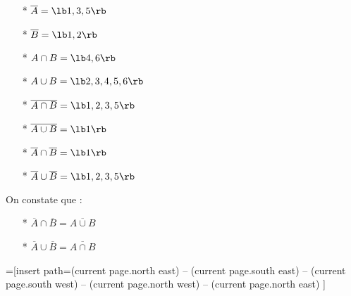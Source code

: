 \begin{itemize}
\item[*] $ \overline{A} = \lb 1,3,5\rb $ \\
\item[*] $ \overline{B} = \lb 1,2 \rb $ \\
\item[*] $ A \cap B = \lb 4, 6 \rb $ \\
\item[*] $ A \cup B = \lb 2,3,4,5,6 \rb $ \\
\item[*] $ \overline{A \cap B} = \lb 1, 2, 3, 5 \rb $ \\
\item[*] $\overline{A \cup B} = \lb 1 \rb $ \\
\item[*] $ \overline{A} \cap \overline{B} = \lb 1 \rb $ \\
\item[*] $ \overline{A} \cup \overline{B} = \lb 1,2,3,5 \rb $ \\
\end{itemize}

On constate que : 

\begin{itemize}
\item[*] $ \overline{A} \cap \overline{B} = \overline{A \cup B} $ \\
\item[*] $ \overline{A} \cup \overline{B} = \overline{A \cap B} $ \\
\end{itemize}


=[insert path={(current page.north east) --
  (current page.south east) --
  (current page.south west) --
  (current page.north west) --
  (current page.north east)}
]

\def\A_rond{(0,-.5)  circle  (1 and 2.5)}
\def\B_rond{(1,1)  circle  (1 and 2)}
\def\GrandRond{(2:0) circle (3.5 and 4)}

